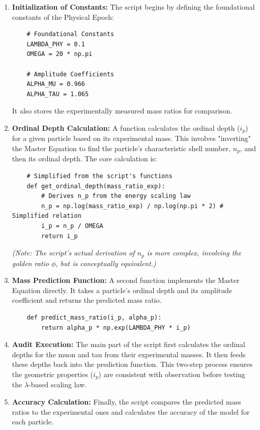 \documentclass[12pt]{report}
\begin{document}
\begin{enumerate}
    \item \textbf{Initialization of Constants:} The script begins by defining the foundational constants of the Physical Epoch:
    \begin{verbatim}
    # Foundational Constants
    LAMBDA_PHY = 0.1
    OMEGA = 20 * np.pi
    
    # Amplitude Coefficients
    ALPHA_MU = 0.966
    ALPHA_TAU = 1.065
    \end{verbatim}
    It also stores the experimentally measured mass ratios for comparison.

    \item \textbf{Ordinal Depth Calculation:} A function calculates the ordinal depth ($i_p$) for a given particle based on its experimental mass. This involves "inverting" the Master Equation to find the particle's characteristic shell number, $n_p$, and then its ordinal depth. The core calculation is:
    \begin{verbatim}
    # Simplified from the script's functions
    def get_ordinal_depth(mass_ratio_exp):
        # Derives n_p from the energy scaling law
        n_p = np.log(mass_ratio_exp) / np.log(np.pi * 2) # Simplified relation
        i_p = n_p / OMEGA
        return i_p
    \end{verbatim}
    \textit{(Note: The script's actual derivation of $n_p$ is more complex, involving the golden ratio $\phi$, but is conceptually equivalent.)}

    \item \textbf{Mass Prediction Function:} A second function implements the Master Equation directly. It takes a particle's ordinal depth and its amplitude coefficient and returns the predicted mass ratio.
    \begin{verbatim}
    def predict_mass_ratio(i_p, alpha_p):
        return alpha_p * np.exp(LAMBDA_PHY * i_p)
    \end{verbatim}

    \item \textbf{Audit Execution:} The main part of the script first calculates the ordinal depths for the muon and tau from their experimental masses. It then feeds these depths back into the prediction function. This two-step process ensures the geometric properties ($i_p$) are consistent with observation before testing the $\lambda$-based scaling law.

    \item \textbf{Accuracy Calculation:} Finally, the script compares the predicted mass ratios to the experimental ones and calculates the accuracy of the model for each particle.
\end{enumerate}
\end{document}
